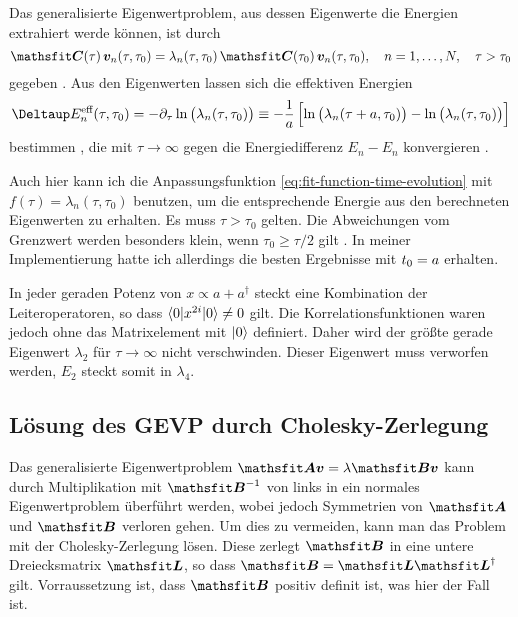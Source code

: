 Das generalisierte Eigenwertproblem, aus dessen Eigenwerte die Energien
extrahiert werde können, ist durch
\[
    \tens C(\tau) \, \vec v_n(\tau, \tau_0) = \lambda_n(\tau, \tau_0) \, \tens
    C(\tau_0) \, \vec v_n(\tau, \tau_0)
    \eqnsep
    n = 1, \ldots, N
    \eqnsep
    \tau > \tau_0
\]
gegeben \parencite[(2.1)]{Blossier/Eigenvalue}. Aus den Eigenwerten lassen sich
die effektiven Energien
\[
    \Deltaup E_n^\text{eff}(\tau, \tau_0) = - \partial_\tau \ln\del{\lambda_n(\tau, \tau_0)} \equiv -
    \frac 1\timestep \sbr{ \ln\del{\lambda_n(\tau+\timestep, \tau_0)} -
    \ln\del{\lambda_n(\tau, \tau_0)} }
\]
bestimmen \parencite[(2.4)]{Blossier/Eigenvalue}, die mit $\tau \to \infty$
gegen die Energiedifferenz $E_n - E_n$ konvergieren
\parencite[(2.3)]{Blossier/Eigenvalue}.

Auch hier kann ich die Anpassungsfunktion
\eqref{eq:fit-function-time-evolution} mit $f(\tau) = \lambda_n(\tau, \tau_0)$
benutzen, um die entsprechende Energie aus den berechneten Eigenwerten zu
erhalten. Es muss $\tau > \tau_0$ gelten. Die Abweichungen vom Grenzwert werden
besonders klein, wenn $\tau_0 \geq \tau/2$ gilt
\parencite[5]{Blossier/Eigenvalue}. In meiner Implementierung hatte ich
allerdings die besten Ergebnisse mit $t_0 = a$ erhalten.

In jeder geraden Potenz von $x \propto a + a^\dagger$ steckt eine Kombination
der Leiteroperatoren, so dass $\braket{0 | x^{2i} | 0} \neq 0$ gilt. Die
Korrelationsfunktionen waren jedoch ohne das Matrixelement mit $\ket 0$
definiert. Daher wird der größte gerade Eigenwert $\lambda_2$ für $\tau \to
\infty$ nicht verschwinden. Dieser Eigenwert muss verworfen werden, $E_2$
steckt somit in $\lambda_4$.

\subsection{Lösung des GEVP durch Cholesky-Zerlegung}

Das generalisierte Eigenwertproblem $\tens A \vec v = \lambda \tens B \vec v$
kann durch Multiplikation mit $\tens B^{-1}$ von links in ein normales
Eigenwertproblem überführt werden, wobei jedoch Symmetrien von $\tens A$ und
$\tens B$ verloren gehen. Um dies zu vermeiden, kann man das Problem mit der
Cholesky-Zerlegung lösen. Diese zerlegt $\tens B$ in eine untere Dreiecksmatrix
$\tens L$, so dass $\tens B = \tens L \tens L^\dagger$ gilt. Vorraussetzung
ist, dass $\tens B$ positiv definit ist, was hier der Fall ist.
\parencite{MacKinnon/GEVP}

